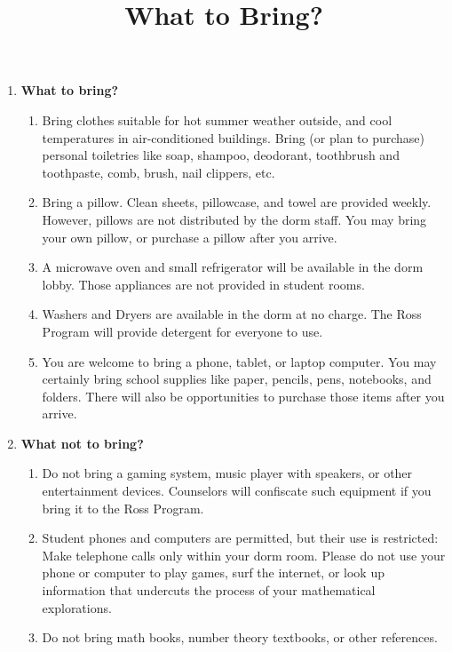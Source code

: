 \documentclass[11pt]{ross}
\title{What to Bring?}
\begin{document}
\maketitle
 \begin{enumerate}[label=(\arabic*),itemsep=2em,topsep=-1em]

\item \textbf{What to bring?}
 \begin{enumerate}[label=(\alph*),itemsep=0.5em,topsep=0em]
 \item Bring clothes suitable for hot summer weather outside, and cool
   temperatures in air-conditioned buildings.  Bring (or plan to
   purchase) personal toiletries like soap, shampoo, deodorant,
   toothbrush and toothpaste, comb, brush, nail clippers, etc.
 \item Bring a pillow.  Clean sheets, pillowcase, and towel are
   provided weekly.  However, pillows are not distributed by the dorm
   staff.  You may bring your own pillow, or purchase a
   pillow after you arrive.
 \item A microwave oven and small refrigerator will be available in
   the dorm lobby.  Those appliances are not provided in student
   rooms.
 \item Washers and Dryers are available in the dorm at no charge.  The
   Ross Program will provide detergent for everyone to use.
 \item You are welcome to bring a phone, tablet, or laptop computer.
   You may certainly bring school supplies like paper, 
   pencils, pens, notebooks, and folders. There will also be opportunities 
   to purchase those items after you arrive.
\end{enumerate}
\item \textbf{What not to bring?}
  \begin{enumerate}[label=(\alph*),itemsep=0.5em,topsep=0em]
  \item Do not bring a gaming system, music player with speakers, 
    or other entertainment devices.  
    Counselors will confiscate such equipment if you bring it to the
    Ross Program.
  \item Student phones and computers are permitted, but their use is
    restricted: Make telephone calls only within your dorm room.
    Please do not use your phone or computer to play games, surf the internet, or
    look up information that undercuts the process of your
    mathematical explorations.
  \item Do not bring math books, number theory textbooks, or other references.  

\end{enumerate}
\end{enumerate}
\end{document}
